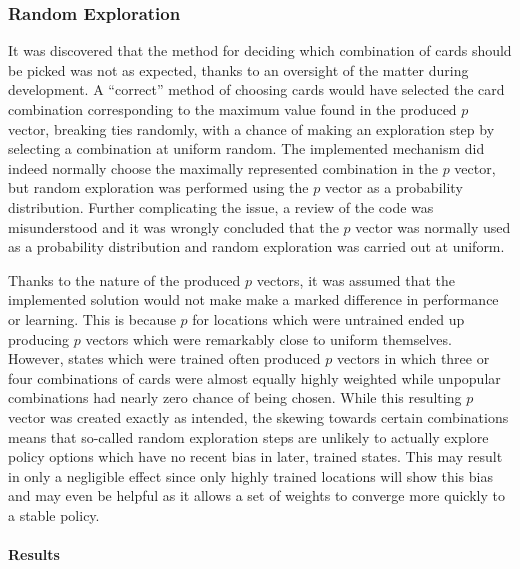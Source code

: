 
\subsubsection*{Random Exploration}
\label{sec:findings-expts-rand}

It was discovered that the method for deciding which combination of cards
should be picked was not as expected,
thanks to an oversight of the matter during development.
%
A ``correct'' method of choosing cards would have selected the card combination
corresponding to the maximum value found in the produced $p$ vector,
breaking ties randomly,
with a chance of making an exploration step by selecting a combination at
uniform random.
%
The implemented mechanism did indeed normally choose the maximally represented
combination in the $p$ vector,
but random exploration was performed using the $p$ vector as a probability
distribution.
%
Further complicating the issue,
a review of the code was misunderstood and it was wrongly concluded that
the $p$ vector was normally used as a probability distribution
and random exploration was carried out at uniform.

Thanks to the nature of the produced $p$ vectors,
it was assumed that the implemented solution would not make make a marked
difference in performance or learning.
%
This is because $p$ for locations which were untrained 
ended up producing $p$ vectors which were remarkably close to
uniform themselves.
%
However,
states which were trained often produced $p$ vectors in which
three or four combinations of cards were almost equally highly weighted
while unpopular combinations had nearly zero chance of being chosen.
%
While this resulting $p$ vector was created exactly as intended,
the skewing towards certain combinations means that so-called
random exploration steps are unlikely to actually explore policy options
which have no recent bias
in later, trained states.
%
This may result in only a negligible effect since
only highly trained locations will show this bias
and may even be helpful as it allows a set of weights to converge more quickly
to a stable policy.


\paragraph*{Results}
\label{sec:findings-expts-rand-results}


